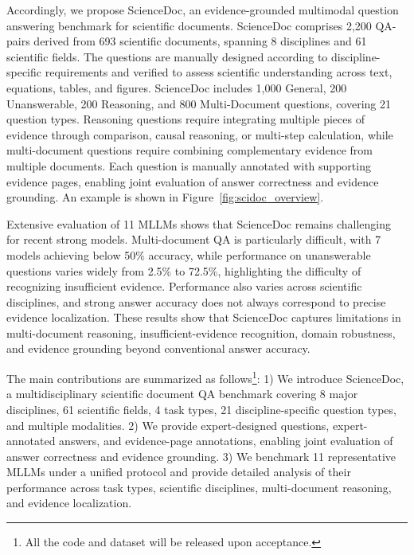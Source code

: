 \documentclass{article} %
\begin{document}
Accordingly, we propose ScienceDoc, an evidence-grounded multimodal question answering benchmark for scientific documents. ScienceDoc comprises 2,200 QA-pairs derived from 693 scientific documents, spanning 8 disciplines and 61 scientific fields.
The questions are manually designed according to discipline-specific requirements and verified to assess scientific understanding across text, equations, tables, and figures. ScienceDoc includes 1,000 General, 200 Unanswerable, 200 Reasoning, and 800 Multi-Document questions, covering 21 question types. Reasoning questions require integrating multiple pieces of evidence through comparison, causal reasoning, or multi-step calculation, while multi-document questions require combining complementary evidence from multiple documents. Each question is manually annotated with supporting evidence pages, enabling joint evaluation of answer correctness and evidence grounding. An example is shown in Figure~\ref{fig:scidoc_overview}.

Extensive evaluation of 11 MLLMs shows that ScienceDoc remains challenging for recent strong models.
Multi-document QA is particularly difficult, with 7 models achieving below 50\% accuracy, while performance on unanswerable questions varies widely from 2.5\% to 72.5\%, highlighting the difficulty of recognizing insufficient evidence. Performance also varies across scientific disciplines, and strong answer accuracy does not always correspond to precise evidence localization. These results show that ScienceDoc captures limitations in multi-document reasoning, insufficient-evidence recognition, domain robustness, and evidence grounding beyond conventional answer accuracy.

The main contributions are summarized as follows\footnote{All the code and dataset will be released upon acceptance.}:
1) We introduce ScienceDoc, a multidisciplinary scientific document QA benchmark covering 8 major disciplines, 61 scientific fields, 4 task types, 21 discipline-specific question types, and multiple modalities.
2) We provide expert-designed questions, expert-annotated answers, and evidence-page annotations, enabling joint evaluation of answer correctness and evidence grounding.
3) We benchmark 11 representative MLLMs under a unified protocol and provide detailed analysis of their performance across task types, scientific disciplines, multi-document reasoning, and evidence localization.
\end{document}
